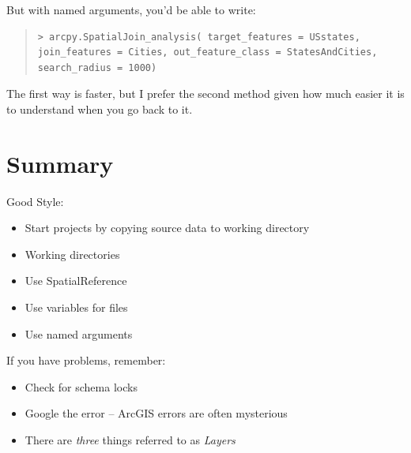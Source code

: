 \documentclass[12pt]{article}
\begin{document}
But with named arguments, you'd be able to write:
\begin{quote}
\begin{verbatim}
> arcpy.SpatialJoin_analysis( target_features = USstates, 
join_features = Cities, out_feature_class = StatesAndCities, 
search_radius = 1000)
\end{verbatim}
\end{quote}

The first way is faster, but I prefer the second method given how much easier it is to understand when you go back to it. 

\section{Summary}
Good Style:
\begin{itemize}
	\item Start projects by copying source data to working directory
	\item Working directories
	\item Use SpatialReference
	\item Use variables for files
	\item Use named arguments
\end{itemize}

If you have problems, remember:
\begin{itemize}
	\item Check for schema locks
	\item Google the error -- ArcGIS errors are often mysterious
	\item There are \emph{three} things referred to as \emph{Layers}
\end{itemize}
\end{document}

